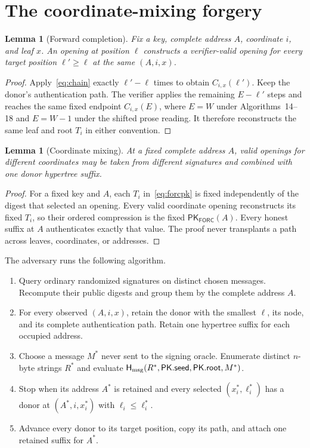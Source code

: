\documentclass[11pt,a4paper]{article}
\newtheorem{lemma}[theorem]{Lemma}
\newcommand{\Hmsg}{\ensuremath{\mathsf{H}_{\rm msg}}}
\newcommand{\FORC}{\ensuremath{\mathsf{FORC}}}
\newcommand{\pk}{\ensuremath{\mathsf{PK}}}
\begin{document}
\section{The coordinate-mixing forgery}

\begin{lemma}[Forward completion]
Fix a key, complete address $A$, coordinate $i$, and leaf $x$.  An opening at
position $\ell$ constructs a verifier-valid opening for every target position
$\ell'\geq\ell$ at the same $(A,i,x)$.
\end{lemma}
\begin{proof}
Apply~\eqref{eq:chain} exactly $\ell'-\ell$ times to obtain
$C_{i,x}(\ell')$.  Keep the donor's authentication path.  The verifier applies
the remaining $E-\ell'$ steps and reaches the same fixed endpoint $C_{i,x}(E)$,
where $E=W$ under Algorithms~14--18 and $E=W-1$ under the shifted prose
reading.  It therefore reconstructs the same leaf and root $T_i$ in either
convention.
\end{proof}

\begin{lemma}[Coordinate mixing]
At a fixed complete address $A$, valid openings for different coordinates may
be taken from different signatures and combined with one donor hypertree
suffix.
\end{lemma}
\begin{proof}
For a fixed key and $A$, each $T_i$ in~\eqref{eq:forcpk} is fixed independently
of the digest that selected an opening.  Every valid coordinate opening
reconstructs its fixed $T_i$, so their ordered compression is the fixed
$\mathsf{PK}_{\FORC}(A)$.  Every honest suffix at $A$ authenticates exactly
that value.  The proof never transplants a path across leaves, coordinates, or
addresses.
\end{proof}

The adversary runs the following algorithm.
\begin{enumerate}[leftmargin=*,itemsep=2pt]
  \item Query ordinary randomized signatures on distinct chosen messages.
        Recompute their public digests and group them by the complete address
        $A$.
  \item For every observed $(A,i,x)$, retain the donor with the smallest
        $\ell$, its node, and its complete authentication path.  Retain one
        hypertree suffix for each occupied address.
  \item Choose a message $M^*$ never sent to the signing oracle.  Enumerate
        distinct $n$-byte strings $R^*$ and evaluate
        $\Hmsg(R^*,\pk.\mathsf{seed},\pk.\mathsf{root},M^*)$.
  \item Stop when its address $A^*$ is retained and every selected
        $(x_i^*,\ell_i^*)$ has a donor at $(A^*,i,x_i^*)$ with
        $\ell_i\leq\ell_i^*$.
  \item Advance every donor to its target position, copy its path, and attach
        one retained suffix for $A^*$.
\end{enumerate}
\end{document}
